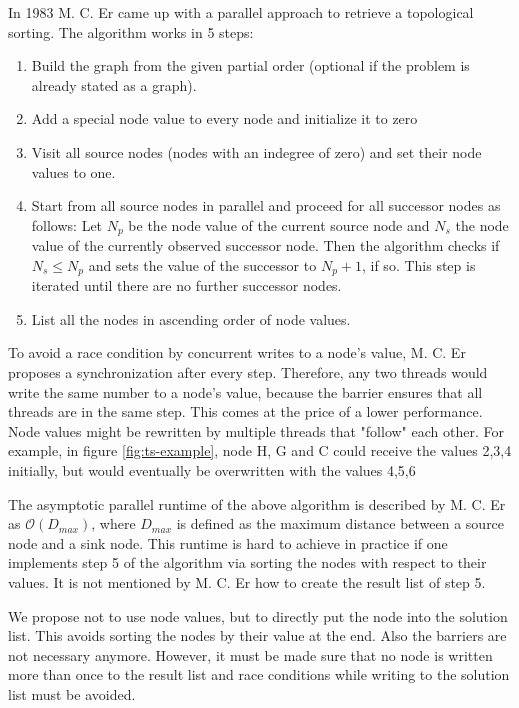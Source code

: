  In 1983 M. C. Er \cite{er1983parallel} came up with a parallel approach to retrieve a topological sorting. The algorithm works in 5 steps:
 \begin{enumerate}
        \item Build the graph from the given partial order (optional if the problem is already stated as a graph).
        \item Add a special node value to every node and initialize it to zero
        \item Visit all source nodes (nodes with an indegree of zero) and set their node values to one.
        \item Start from all source nodes in parallel and proceed for all successor nodes as follows: Let $N_p$ be the node value of the current source node and $N_s$ the node value of the currently observed successor node. Then the algorithm checks if $N_s \leq N_p$ and sets the value of the successor to $N_p + 1$, if so. This step is iterated until there are no further successor nodes. 
        \item List all the nodes in ascending order of node values.
 \end{enumerate}

To avoid a race condition by concurrent writes to a node’s value, M. C. Er proposes a synchronization after every step. Therefore, any two threads would write the same number to a node’s value, because the barrier ensures that all threads are in the same step. This comes at the price of a lower performance. Node values might be rewritten by multiple threads that "follow" each other. For example, in figure \ref{fig:ts-example}, node H, G and C could receive the values 2,3,4 initially, but would eventually be overwritten with the values 4,5,6


The asymptotic parallel runtime of the above algorithm is described by M. C. Er as $\mathcal{O}(D_{max})$, where $D_{max}$ is defined as the maximum distance between a source node and a sink node. This runtime is hard to achieve in practice if one implements step 5 of the algorithm via sorting the nodes with respect to their values. It is not mentioned by M. C. Er how to create the result list of step 5.


We propose not to use node values, but to directly put the node into the solution list. This avoids sorting the nodes by their value at the end. Also the barriers are not necessary anymore. However, it must be made sure that no node is written more than once to the result list and race conditions while writing to the solution list must be avoided.

